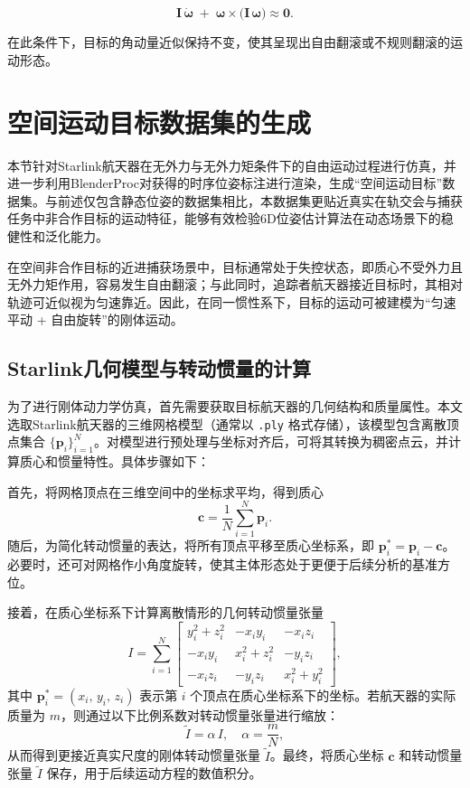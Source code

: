 \begin{equation}
	\mathbf{I}\,\dot{\boldsymbol{\omega}}
	\;+\;
	\boldsymbol{\omega} \times \bigl(\mathbf{I}\,\boldsymbol{\omega}\bigr)
	\approx \mathbf{0}.
\end{equation}

在此条件下，目标的角动量近似保持不变，使其呈现出自由翻滚或不规则翻滚的运动形态。

\section{空间运动目标数据集的生成}
本节针对Starlink航天器在无外力与无外力矩条件下的自由运动过程进行仿真，并进一步利用BlenderProc对获得的时序位姿标注进行渲染，生成“空间运动目标”数据集。与前述仅包含静态位姿的数据集相比，本数据集更贴近真实在轨交会与捕获任务中非合作目标的运动特征，能够有效检验6D位姿估计算法在动态场景下的稳健性和泛化能力。

在空间非合作目标的近进捕获场景中，目标通常处于失控状态，即质心不受外力且无外力矩作用，容易发生自由翻滚；与此同时，追踪者航天器接近目标时，其相对轨迹可近似视为匀速靠近。因此，在同一惯性系下，目标的运动可被建模为“匀速平动 + 自由旋转”的刚体运动。

\subsection{Starlink几何模型与转动惯量的计算}
为了进行刚体动力学仿真，首先需要获取目标航天器的几何结构和质量属性。本文选取Starlink航天器的三维网格模型（通常以 \texttt{.ply} 格式存储），该模型包含离散顶点集合 \(\{\mathbf{p}_i\}_{i=1}^{N}\)。对模型进行预处理与坐标对齐后，可将其转换为稠密点云，并计算质心和惯量特性。具体步骤如下：

首先，将网格顶点在三维空间中的坐标求平均，得到质心
\begin{equation}
	\mathbf{c} = \frac{1}{N} \sum_{i=1}^{N} \mathbf{p}_i.
\end{equation}
随后，为简化转动惯量的表达，将所有顶点平移至质心坐标系，即 
\(\mathbf{p}_i^{*} = \mathbf{p}_i - \mathbf{c}\)。
必要时，还可对网格作小角度旋转，使其主体形态处于更便于后续分析的基准方位。

接着，在质心坐标系下计算离散情形的几何转动惯量张量
\begin{equation}
	I =
	\sum_{i=1}^{N}
	\begin{bmatrix}
		y_i^2 + z_i^2 & -x_i y_i      & -x_i z_i \\
		-x_i y_i      & x_i^2 + z_i^2 & -y_i z_i \\
		-x_i z_i      & -y_i z_i      & x_i^2 + y_i^2
	\end{bmatrix},
\end{equation}
其中 \(\mathbf{p}_i^{*} = (x_i,\,y_i,\,z_i)\) 表示第 \(i\) 个顶点在质心坐标系下的坐标。若航天器的实际质量为 \(m\)，则通过以下比例系数对转动惯量张量进行缩放：
\begin{equation}
	\widetilde{I} = \alpha \, I, 
	\quad 
	\alpha = \frac{m}{N},
\end{equation}
从而得到更接近真实尺度的刚体转动惯量张量 \(\widetilde{I}\)。最终，将质心坐标 \(\mathbf{c}\) 和转动惯量张量 \(\widetilde{I}\) 保存，用于后续运动方程的数值积分。

